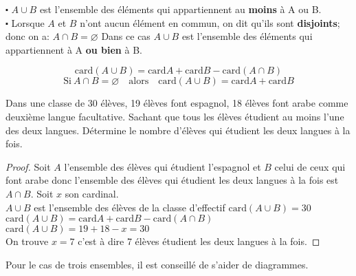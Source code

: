 \begin{remark}

$ \centerdot $ $A\cup B$ est l'ensemble des éléments qui appartiennent  au \textbf{moins} à A ou B.\\
$ \centerdot $ Lorsque $ A$ et  $ B$ n'ont aucun élément en commun, on dit qu'ils sont \textbf{disjoints}; donc on a: $ A\cap B=\varnothing $ Dans ce cas  $A\cup B$  est l'ensemble des éléments qui appartiennent à A \textbf{ ou bien} à B.
\end{remark}
\begin{property}
                 \[\textrm{card}(A\cup B)= \textrm{card}A  + \textrm{card}B- \textrm{card}(A\cap B)    \]
                  \[ \textrm{Si}\  A\cap B=\varnothing \quad \textrm{alors}\quad \textrm{card}(A\cup B)= \textrm{card}A  + \textrm{card}B    \]
\end{property}
\begin{exercice}

Dans une classe de 30 élèves, 19 élèves font espagnol, 18 élèves font arabe comme deuxième langue facultative. Sachant que tous les élèves étudient au moins l'une des deux  langues. Détermine le nombre d'élèves qui étudient les deux langues à la fois.
\end{exercice}


\begin{proof}

Soit $ A $ l'ensemble des élèves qui étudient l'espagnol et $ B $ celui de ceux qui font arabe donc l'ensemble des élèves qui étudient les deux langues à la fois est $A\cap B.  $ Soit $ x $ son cardinal. \\
$ A\cup B $  est l'ensemble des élèves de la classe d'effectif $ \textrm{card}(A\cup B)=30 $\\
$ \textrm{card}(A\cup B)= \textrm{card}A  + \textrm{card}B- \textrm{card}(A\cap B)    $\\
$\textrm{card}(A\cup B)= 19+18-x=30  $\\
 On trouve $ x=7 $ c'est à dire 7 élèves étudient les deux langues à la fois.
 \end{proof}
\begin{remark}
Pour le cas de trois ensembles, il est conseillé de s'aider de diagrammes.
\end{remark}


